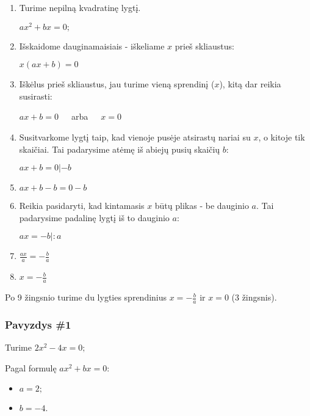\documentclass[a4paper]{article}
\begin{document}
\begin{enumerate}
      \item Turime nepilną kvadratinę lygtį.

            $ ax^{2}+ bx = 0; $
      \item Išskaidome dauginamaisiais - iškeliame $ x $ prieš skliaustus:

            $ x(ax + b) = 0 $
      \item Iškėlus prieš skliaustus, jau turime vieną sprendinį ($ x $), kitą
            dar reikia susirasti:

            $ ax+b = 0 $ $\;\;\;$ arba $\;\;\;$ $ x=0 $
      \item Susitvarkome lygtį taip, kad vienoje pusėje atsirastų nariai su $ x
            $, o kitoje tik skaičiai. Tai padarysime atėmę iš abiejų pusių
            skaičių $ b $:

            $ ax+b = 0 | - b $
      \item  $ ax+b-b = 0-b $
      \item Reikia pasidaryti, kad kintamasis $ x $ būtų plikas - be dauginio $
                  a
            $. Tai padarysime padalinę lygtį iš to dauginio $ a $:

            $ ax = -b | : a $
      \item $ \frac{ax}{a} = -\frac{b}{a} $
      \item $ x = -\frac{b}{a} $
\end{enumerate}
Po 9 žingsnio turime du lygties sprendinius $ x = -\frac{b}{a} $ ir $ x=0 $ (3
žingsnis).

\subsubsection{Pavyzdys \#1}

Turime $ 2x^{2}-4x = 0; $

Pagal formulę $ ax^{2}+ bx = 0 $:

\begin{itemize}
      \item $ a = 2; $
      \item $ b = -4 $.
\end{itemize}
\end{document}
